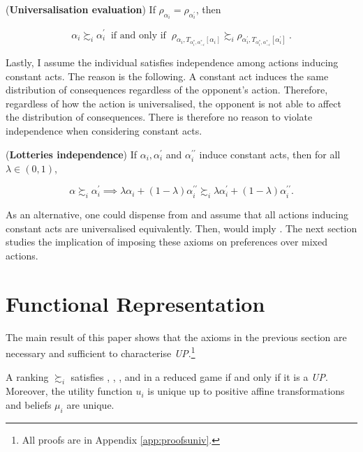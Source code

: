 \begin{axiom}\label{ax:ceval}
	(\textbf{Universalisation evaluation}) If \( \rho_{\alpha_i} = \rho_{\alpha^{\prime}_{i}} \), then

	\[ \alpha_{i} \succsim_{i} \alpha^{\prime}_{i} \: \text{ if and only if } \: \rho_{\alpha_i, T_{\alpha^{*}_i, \alpha^{*}_{-i}} [ \alpha_i ]} \succsim_i \rho_{\alpha^{\prime}_i, T_{\alpha^{*}_i, \alpha^{*}_{-i}} [ \alpha^{\prime}_i ]} \: . \]
\end{axiom}

Lastly, I assume the individual satisfies independence among actions inducing constant acts. The reason is the following. A constant act induces the same distribution of consequences regardless of the opponent's action. Therefore, regardless of how the action is universalised, the opponent is not able to affect the distribution of consequences. There is therefore no reason to violate independence when considering constant acts.

\begin{axiom}\label{ax:lindep}
	 (\textbf{Lotteries independence}) If \( \alpha_i, \alpha^{\prime}_i \) and \( \alpha_{i}^{\prime \prime} \) induce constant acts, then for all \( \lambda \in (0,1) \),

	\[ \alpha \succsim_i \alpha^{\prime}_i \implies \lambda \alpha_i + ( 1- \lambda ) \alpha_{i}^{\prime \prime} \succsim_i \lambda \alpha^{\prime}_i + ( 1- \lambda ) \alpha_{i}^{\prime \prime} .\]
\end{axiom}

As an alternative, one could dispense from  and assume that all actions inducing constant acts are universalised equivalently. Then,  would imply . The next section studies the implication of imposing these axioms on preferences over mixed actions.

\section{Functional Representation}\label{sec:repuniv}

The main result of this paper shows that the axioms in the previous section are necessary and sufficient to characterise \textit{UP}.\footnote{All proofs are in Appendix \ref{app:proofsuniv}.}

\begin{theorem}\label{thm:sep}
	A ranking \( \succsim_i \) satisfies , , ,  and  in a reduced game if and only if it is a \textit{UP}. Moreover, the utility function \( u_i \) is unique up to positive affine transformations and beliefs \( \mu_i \) are unique.
\end{theorem}

